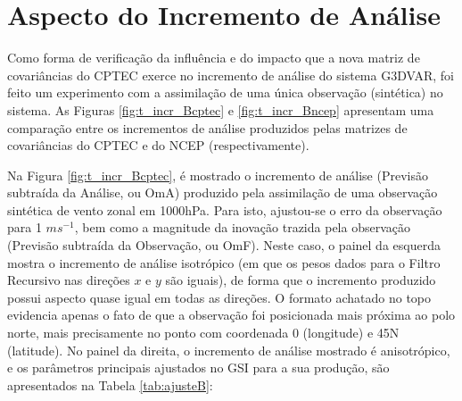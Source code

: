 \section{Aspecto do Incremento de Análise}

Como forma de verificação da influência e do impacto que a nova matriz de covariâncias do CPTEC exerce no incremento de análise do sistema G3DVAR, foi feito um experimento com a assimilação de uma única observação (sintética) no sistema. As Figuras \ref{fig:t_incr_Bcptec} e \ref{fig:t_incr_Bncep} apresentam uma comparação entre os incrementos de análise produzidos pelas matrizes de covariâncias do CPTEC e do NCEP (respectivamente).

Na Figura \ref{fig:t_incr_Bcptec}, é mostrado o incremento de análise (Previsão subtraída da Análise, ou OmA) produzido pela assimilação de uma observação sintética de vento zonal em 1000hPa. Para isto, ajustou-se o erro da observação para 1 $ms^{-1}$, bem como a magnitude da inovação trazida pela observação (Previsão subtraída da Observação, ou OmF). Neste caso, o painel da esquerda mostra o incremento de análise isotrópico (em que os pesos dados para o Filtro Recursivo nas direções $x$ e $y$ são iguais), de forma que o incremento produzido possui aspecto quase igual em todas as direções. O formato achatado no topo evidencia apenas o fato de que a observação foi posicionada mais próxima ao polo norte, mais precisamente no ponto com coordenada 0 (longitude) e 45N (latitude). No painel da direita, o incremento de análise mostrado é anisotrópico, e os parâmetros principais ajustados no GSI para a sua produção, são apresentados na Tabela \ref{tab:ajusteB}:

